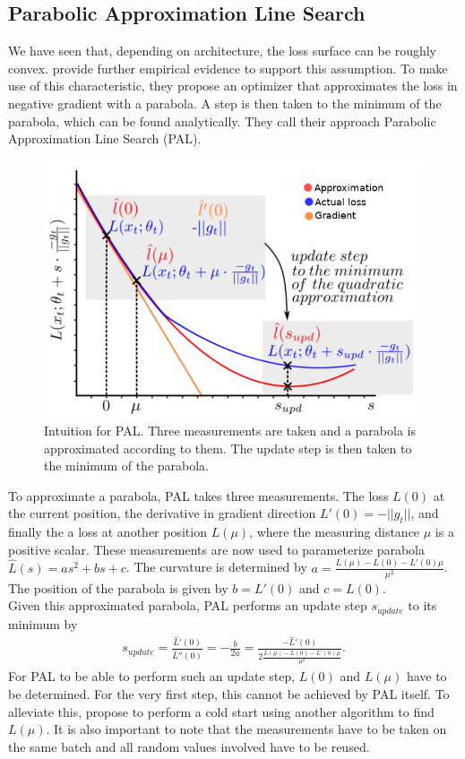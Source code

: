\documentclass[a4paper]{scrartcl}
\begin{document}
\subsection*{Parabolic Approximation Line Search}
We have seen that, depending on architecture, the loss surface can be roughly convex. \cite{mutschler2020parabolic} provide further empirical evidence to support this assumption. To make use of this characteristic, they propose an optimizer that approximates the loss in negative gradient with a parabola. A step is then taken to the minimum of the parabola, which can be found analytically. They call their approach Parabolic Approximation Line Search (PAL).
\label{fig:pal}
\begin{figure}[H]
	\centering
	\includegraphics[width=.6\linewidth]{figures/pal_1.png}
	\caption{Intuition for PAL. Three measurements are taken and a parabola is approximated according to them. The update step is then taken to the minimum of the parabola.}
\end{figure}
To approximate a parabola, PAL takes three measurements. The loss $L(0)$ at the current position, the derivative in gradient direction $L'(0) = - ||g_t||$, and finally the a loss at another position $L(\mu)$, where the measuring distance $\mu$ is a positive scalar. These measurements are now used to parameterize parabola $\hat{L}(s) = as^2 + bs + c$. The curvature is determined by $a = \frac{L(\mu)-L(0) - L'(0)\mu}{\mu^2}$. The position of the parabola is given by $b=L'(0)$ and $c=L(0)$.\\
Given this approximated parabola, PAL performs an update step $s_{update}$ to its minimum by
\begin{align}
	s_{update} = \frac{\hat{L}'(0)}{\hat{L}''(0)} = -\frac{b}{2a} = \frac{-\hat{L}'(0)}{2\frac{L(\mu)-L(0) - L'(0)\mu}{\mu^2}}.
\end{align}
For PAL to be able to perform such an update step, $L(0)$ and $L(\mu)$ have to be determined. For the very first step, this cannot be achieved by PAL itself. To alleviate this, \cite{mutschler2020parabolic} propose to perform a cold start using another algorithm to find  $L(\mu)$. It is also important to note that the measurements have to be taken on the same batch and all random values involved have to be reused.\\
\end{document}
